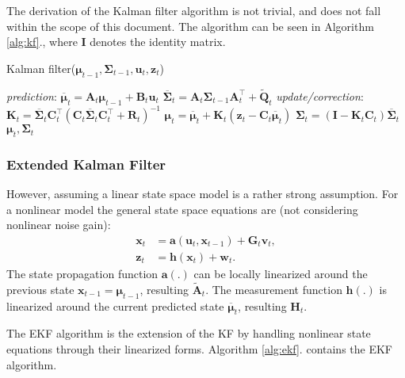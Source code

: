 The derivation of the Kalman filter algorithm is not trivial, and does not fall within the scope of this document. The algorithm can be seen in Algorithm \ref{alg:kf}., where $\mathbf{I}$ denotes the identity matrix.

\begin{algorithm}
    \caption{Kalman filter($\boldsymbol{\mu}_{t-1},\mathbf{\Sigma}_{t-1},\mathbf{u}_t,\mathbf{z}_t$)}\label{alg:kf}
    \begin{algorithmic}[1]
        \BState \emph{prediction}:
        \State\indent$\overline{\boldsymbol{\mu}}_t = \mathbf{A}_t{\boldsymbol{\mu}}_{t-1} + \mathbf{B}_t\mathbf{u}_t$
        \State\indent $\overline{\mathbf{\Sigma}}_t = \mathbf{A}_t\mathbf{\Sigma}_{t-1}\mathbf{A}^\top_t + \tilde{\mathbf{Q}}_t$
        \BState \emph{update/correction}:
        \State\indent $\mathbf{K}_t = \overline{\mathbf{\Sigma}}_t\mathbf{C}_t^\top\left(\mathbf{C}_t\overline{\mathbf{\Sigma}}_t\mathbf{C}_t^\top+\mathbf{R}_t\right)^{-1}$
        \State\indent $\boldsymbol{\mu}_t = \overline{\boldsymbol{\mu}}_t + \mathbf{K}_t\left(\mathbf{z}_t-\mathbf{C}_t\overline{\boldsymbol{\mu}}_t\right)$
        \State\indent $\mathbf{\Sigma}_t = \left(\mathbf{I}-\mathbf{K}_t\mathbf{C}_t\right)\overline{\mathbf{\Sigma}}_t$
        \State\Return $\boldsymbol{\mu}_t,\mathbf{\Sigma}_t$
    \end{algorithmic}
\end{algorithm}
\subsubsection{Extended Kalman Filter}
However, assuming a linear state space model is a rather strong assumption. For a nonlinear model the general state space equations are (not considering nonlinear noise gain):
\begin{align}\label{key}
    \mathbf{x}_t & = \mathbf{a}(\mathbf{u}_t,\mathbf{x}_{t-1}) + \mathbf{G}_t\mathbf{v}_t, \\
    \mathbf{z}_t & = \mathbf{h}(\mathbf{x}_t) + \mathbf{w}_t.
\end{align}
The state propagation function $\mathbf{a}(.)$ can be locally linearized around the previous state $\mathbf{x}_{t-1} = \boldsymbol{\mu}_{t-1}$, resulting $\tilde{\mathbf{A}}_t$. The measurement function $\mathbf{h}(.)$ is linearized around the current predicted state $\overline{\boldsymbol{\mu}}_t$, resulting $\mathbf{H}_t$.

The EKF algorithm is the extension of the KF by handling nonlinear state equations through their linearized forms. Algorithm \ref{alg:ekf}. contains the EKF algorithm.

